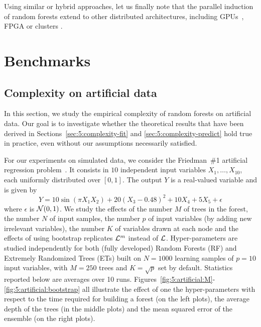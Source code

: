 Using similar or hybrid approaches, let us finally note that the parallel
induction of random forests extend to other distributed architectures,
including GPUs~\citep{sharp:2008,liao:2013}, FPGA \citep{narayanan:2007} or
clusters \citep{mitchell:2011}.

\section{Benchmarks}
\label{sec:5:benchmarks}

\subsection{Complexity on artificial data}
\label{sec:5:benchmarks:artificial}

In this section, we study the empirical complexity of random
forests on artificial data. Our goal is to investigate whether the
theoretical results that have been derived in Sections~\ref{sec:5:complexity-fit}
and \ref{sec:5:complexity-predict} hold true in practice, even without
our assumptions necessarily satisfied.

For our experiments on simulated data, we consider the Friedman~\#1 artificial
regression problem~\citep{friedman:1991}. It consists in $10$ independent
input variables $X_1, \dots, X_{10}$, each uniformly distributed over $[0,1]$.
The output $Y$ is a real-valued variable and is given by
\begin{equation}
Y = 10 \sin(\pi X_1 X_2) + 20(X_3 - 0.48)^2 + 10 X_4 + 5 X_5 + \epsilon
\end{equation}
where $\epsilon$ is ${\cal N}(0, 1)$. We study the effects of the number $M$ of
trees in the forest, the number $N$ of input samples, the number $p$ of input
variables (by adding new irrelevant variables), the number $K$ of variables drawn at each node and the effects of
using bootstrap replicates ${\cal L}^m$ instead of ${\cal L}$. Hyper-parameters are studied independently
for both (fully developed) Random Forests (RF) and Extremely Randomized Trees (ETs) built
on $N=1000$ learning samples of $p=10$ input variables, with $M=250$ trees and $K=\sqrt{p}$ set by
default. Statistics reported below are averages over 10 runs. Figures~\ref{fig:5:artificial:M}-\ref{fig:5:artificial:bootstrap}
all illustrate the effect of one the hyper-parameters with respect to the time required for building
a forest (on the left plots), the average depth of the trees (in the middle plots)
and the mean squared error of the ensemble (on the right plots).

